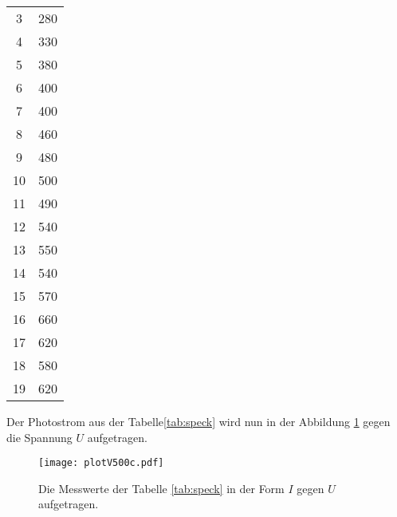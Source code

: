 \begin{center}
\begin{longtable}{c c}
  3   &  280\\
  4   &  330\\
  5   &  380\\
  6   &  400\\
  7   &  400\\
  8   &  460\\
  9   &  480\\
  10  &  500\\
  11  &  490\\
  12  &  540\\
  13  &  550\\
  14  &  540\\
  15  &  570\\
  16  &  660\\
  17  &  620\\
  18  &  580\\
  19  &  620\\
\end{longtable}
\end{center}

Der Photostrom aus der Tabelle\ref{tab:speck} wird nun in der Abbildung \ref{fig:speck} gegen
die Spannung $U$ aufgetragen.


\begin{figure}
 \centering
 \texttt{[image: plotV500c.pdf]}
 \caption{Die Messwerte der Tabelle \ref{tab:speck} in der Form
 $I$ gegen $U$ aufgetragen.}
 \label{fig:speck}
\end{figure}
